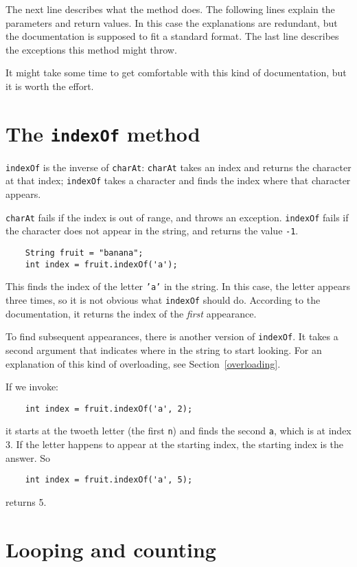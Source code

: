 \documentclass[12pt]{book}
\theoremstyle{definition}
\begin{document}
The next line describes what the method does.  The following
lines explain the parameters and return values.  In this case
the explanations are redundant, but the documentation is
supposed to fit a standard format.  The last line describes
the exceptions this method might throw.

It might take some time to get 
comfortable with this kind of documentation, but it is worth the effort.


\section{The {\tt indexOf} method}

{\tt indexOf} is the inverse of {\tt charAt}:
{\tt charAt} takes an index and returns the character at that
index;  {\tt indexOf} takes a character and finds the index
where that character appears.

{\tt charAt} fails if the index is out of range, and throws an
exception.  {\tt indexOf} fails if the character does not appear in
the string, and returns the value {\tt -1}.

\begin{lstlisting}
    String fruit = "banana";
    int index = fruit.indexOf('a');
\end{lstlisting}
%
This finds the index of the letter {\tt 'a'} in the string.
In this case, the letter appears three times, so it is not
obvious what {\tt indexOf} should do.  According to the
documentation, it returns the index of the {\em first} appearance.

To find subsequent appearances, there is another
version of {\tt indexOf}.  It takes a
second argument that indicates where in the string to start
looking.  For an explanation of this kind
of overloading, see Section~\ref{overloading}.

If we invoke:

\begin{lstlisting}
    int index = fruit.indexOf('a', 2);
\end{lstlisting}
%
it starts at the twoeth letter (the first {\tt n}) and finds
the second {\tt a}, which is at index 3.  If the letter happens
to appear at the starting index, the starting index is the
answer.  So

\begin{lstlisting}
    int index = fruit.indexOf('a', 5);
\end{lstlisting}
%
returns 5.  


\section{Looping and counting}
\label{loopcount}
\end{document}

